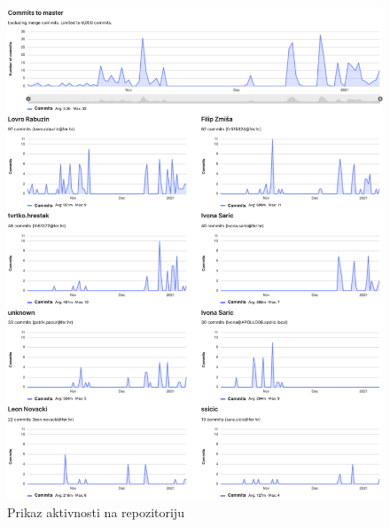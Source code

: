 		\begin{figure}[H]
			\centering
			\includegraphics[width=1\linewidth]{slike/contributions}
			\caption{Prikaz aktivnosti na repozitoriju}
			\label{fig:contributions}
		\end{figure}
	